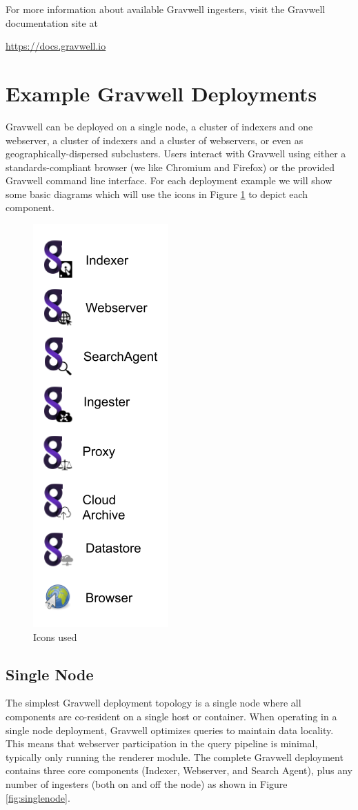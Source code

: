 For more information about available
Gravwell ingesters, visit the Gravwell documentation site at
{\href{https://docs.gravwell.io}{https://docs.gravwell.io}

\section{Example Gravwell Deployments}

Gravwell can be deployed on a single node, a cluster of indexers and one webserver, a
cluster of indexers and a cluster of webservers, or even as geographically-dispersed subclusters.
Users interact with Gravwell using either a standards-compliant browser
(we like Chromium and Firefox) or the provided Gravwell command line
interface. For each deployment example we will show some basic diagrams
which will use the icons in Figure \ref{fig:archicons} to depict each component.

\begin{figure}
	\includegraphics[width=0.2\linewidth]{images/archicons.png}
	\caption{Icons used}
	\label{fig:archicons}
\end{figure}

\subsection{Single Node}

The simplest Gravwell deployment topology is a single node where all
components are co-resident on a single host or container. When
operating in a single node deployment, Gravwell optimizes queries to
maintain data locality. This means that webserver participation in the
query pipeline is minimal, typically only running the renderer module.
The complete Gravwell deployment contains three core components (Indexer,
Webserver, and Search Agent), plus any number of ingesters (both on and off the node) as shown in Figure \ref{fig:singlenode}.

}
